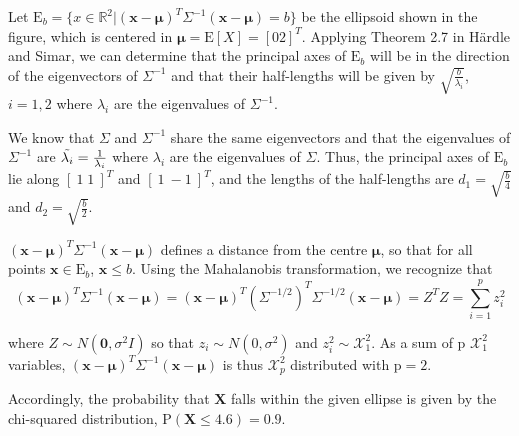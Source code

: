Let $\text{E}_b = \{ x \in \mathbb{R}^2 | (\mathbf{x} - \mathbf{\mu})^T \Sigma^{-1}(\mathbf{x} - \mathbf{\mu}) = b \}$ be the ellipsoid shown in the figure, which is centered in $\mathbf{\mu} = \text{E}[X] = [0 2]^T$. 
Applying Theorem 2.7 in Härdle and Simar, we can determine that the principal axes of $\text{E}_b$ will be in the direction of the eigenvectors of $\Sigma^{-1}$ and that their half-lengths will be given by $\sqrt{\frac{b}{\lambda_i}}$, $i =1,2$ where $\lambda_i$ are the eigenvalues of $\Sigma^{-1}$.

We know that $\Sigma$ and $\Sigma^{-1}$ share the same eigenvectors and that the eigenvalues of $\Sigma^{-1}$ are  $\Tilde{\lambda_i}= \frac{1}{{\lambda_i}}$ where $\lambda_i$ are the eigenvalues of $\Sigma$. 
Thus, the principal axes of $\text{E}_b$ lie along $[\: 1 \;  1\: ]^T$ and $[\: 1 \ -1\:]^T$, and the lengths of the half-lengths are $d_1 = \sqrt{\frac{b}{4}}$ and $d_2 = \sqrt{\frac{b}{2}}$.


$(\mathbf{x}- \mathbf{\mu})^T\Sigma^{-1} (\mathbf{x}- \mathbf{\mu})$ defines a distance from the centre $\mathbf{\mu}$, so that for all points $\mathbf{x} \in \text{E}_b$, $\mathbf{x} \leq b$. 
Using the Mahalanobis transformation, we recognize that 
\begin{equation*}
    (\mathbf{x}- \mathbf{\mu})^T\Sigma^{-1} (\mathbf{x}- \mathbf{\mu})
    = (\mathbf{x}- \mathbf{\mu})^T(\Sigma^{-1/2})^T\Sigma^{-1/2}(\mathbf{x}- \mathbf{\mu}) = Z^TZ = \sum_{i=1}^p z_i^2
\end{equation*}

where $Z \sim N(\mathbf{0}, \sigma^2 I)$ so that $z_i \sim N(0,\sigma^2)$ and $z_i^2 \sim \mathcal{X}_1^2$. As a sum of p $\mathcal{X}_1^2$ variables, $(\mathbf{x}- \mathbf{\mu})^T\Sigma^{-1} (\mathbf{x}- \mathbf{\mu})$ is thus $\mathcal{X}_p^2$ distributed with $\text{p}=2$. %

Accordingly, the probability that $\mathbf{X}$ falls within the given ellipse is given by the chi-squared distribution, $\text{P}(\mathbf{X} \leq 4.6) = 0.9$.